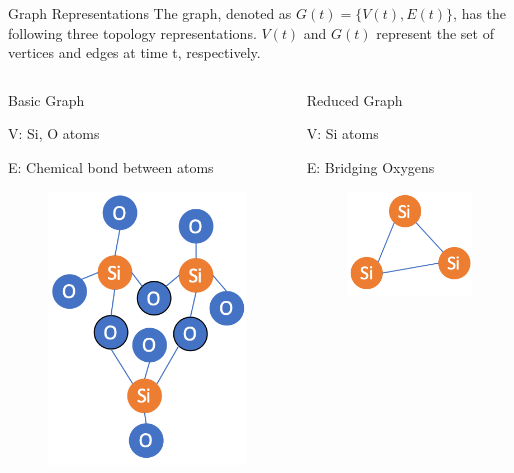 \begin{frame}[t]{Graph Representations}
The graph, denoted as $G(t)=\{V(t),E(t)\}$, has the following three topology representations. $V(t)$ and $G(t)$ represent the set of vertices and edges at time t, respectively.

 \begin{columns}[t]
 
   \begin{block}{Basic Graph}
   \begin{itemize}
   \begin{footnotesize}
       \item V: Si, O atoms
       \item E: Chemical bond between atoms
    \end{footnotesize}
    \end{itemize}
    \begin{figure}
	    \centering
        \includegraphics[width=.5\textwidth]{images/basic.png}
	\end{figure}
   \end{block}
   
   \begin{block}{Reduced Graph}
   \begin{itemize}
   \begin{footnotesize}
       \item V: Si atoms
       \item E: Bridging Oxygens
    \end{footnotesize}
   \end{itemize}
    \begin{figure}
	    \centering
        \includegraphics[width=.5\textwidth]{images/reduced.png}
	\end{figure}
   \end{block}
   

\end{columns}
\end{frame}

